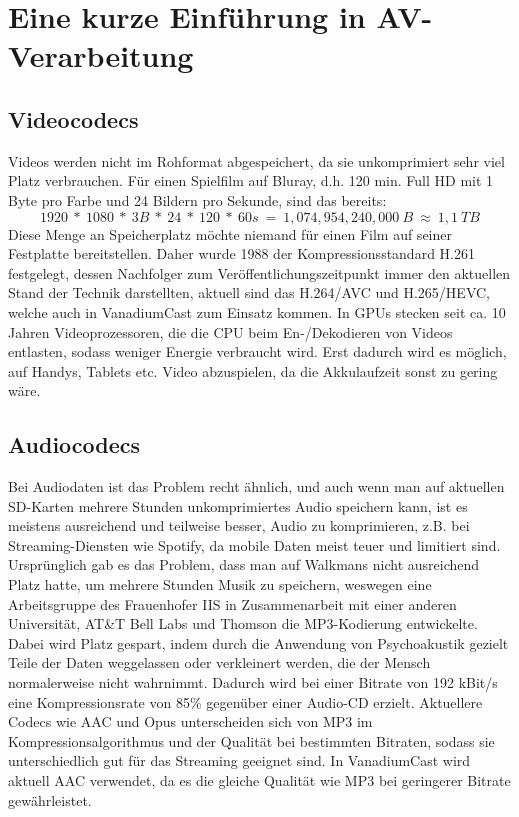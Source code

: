\documentclass{article}
\begin{document}
    \newpage


    \section{Eine kurze Einführung in AV-Verarbeitung}\label{sec:eine-kurze-einführung-in-av-verarbeitung}

    \subsection{Videocodecs}\label{subsec:videocodecs}

    Videos werden nicht im Rohformat abgespeichert, da sie unkomprimiert
    sehr viel Platz verbrauchen. Für einen Spielfilm auf Bluray, d.h. 120
    min. Full HD mit 1 Byte pro Farbe und 24 Bildern pro Sekunde, sind das
    bereits:
    \[1920\ *\ 1080\ *\ 3B\ *\ 24\ *\ 120\ *\ 60s\ =\ 1,074,954,240,000\ B\ \approx\ 1,1\ TB\]
    Diese Menge an Speicherplatz möchte niemand für einen Film auf seiner
    Festplatte bereitstellen. Daher wurde 1988 der Kompressionsstandard
    H.261 festgelegt, dessen Nachfolger zum Veröffentlichungszeitpunkt immer
    den aktuellen Stand der Technik darstellten, aktuell sind das H.264/AVC
    und H.265/HEVC, welche auch in VanadiumCast zum Einsatz kommen. In GPUs
    stecken seit ca. 10 Jahren Videoprozessoren, die die CPU beim
    En-/Dekodieren von Videos entlasten, sodass weniger Energie verbraucht
    wird. Erst dadurch wird es möglich, auf Handys, Tablets etc. Video
    abzuspielen, da die Akkulaufzeit sonst zu gering wäre.

    \subsection{Audiocodecs}\label{subsec:audiocodecs}

    Bei Audiodaten ist das Problem recht ähnlich, und auch wenn man auf
    aktuellen SD-Karten mehrere Stunden unkomprimiertes Audio speichern
    kann, ist es meistens ausreichend und teilweise besser, Audio zu
    komprimieren, z.B. bei Streaming-Diensten wie Spotify, da mobile Daten
    meist teuer und limitiert sind. Ursprünglich gab es das Problem, dass
    man auf Walkmans nicht ausreichend Platz hatte, um mehrere Stunden Musik
    zu speichern, weswegen eine Arbeitsgruppe des Frauenhofer IIS in
    Zusammenarbeit mit einer anderen Universität, AT\&T Bell Labs und
    Thomson die MP3-Kodierung entwickelte. Dabei wird Platz gespart, indem
    durch die Anwendung von Psychoakustik gezielt Teile der Daten
    weggelassen oder verkleinert werden, die der Mensch normalerweise nicht
    wahrnimmt. Dadurch wird bei einer Bitrate von 192 kBit/s eine
    Kompressionsrate von 85\% gegenüber einer Audio-CD erzielt. Aktuellere
    Codecs wie AAC und Opus unterscheiden sich von MP3 im
    Kompressionsalgorithmus und der Qualität bei bestimmten Bitraten, sodass
    sie unterschiedlich gut für das Streaming geeignet sind. In VanadiumCast
    wird aktuell AAC verwendet, da es die gleiche Qualität wie MP3 bei
    geringerer Bitrate gewährleistet.
\end{document}
